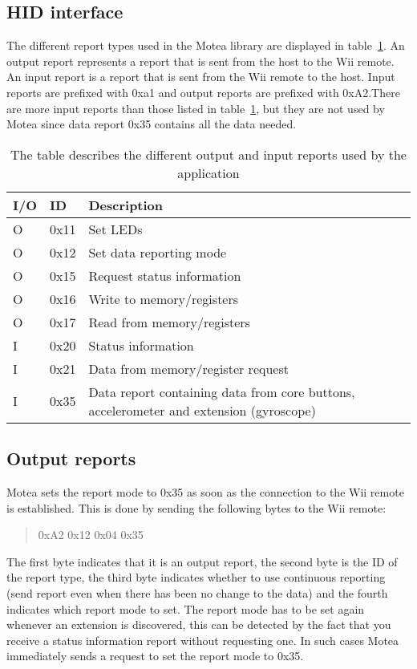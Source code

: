 \subsection{HID interface}
The different report types used in the Motea library are displayed in table~\ref{tab:hidInterface}. An output report represents a report that is sent from the host to the Wii remote. An input report is a report that is sent from the Wii remote to the host. Input reports are prefixed with 0xa1 and output reports are prefixed with 0xA2.There are more input reports than those listed in table~\ref{tab:hidInterface}, but they are not used by Motea since data report 0x35 contains all the data needed. 

\begin{table}[h!]
\centering
\begin{tabularx}{\textwidth}{|l|l|X|}
\hline
I/O & ID & Description \\ \hline
O & 0x11 & Set LEDs \\ \hline
O & 0x12 & Set data reporting mode \\ \hline
O & 0x15 & Request status information \\ \hline
O & 0x16 & Write to memory/registers \\ \hline
O & 0x17 & Read from memory/registers \\ \hline
I & 0x20 & Status information \\ \hline
I & 0x21 & Data from memory/register request \\ \hline
I & 0x35 & Data report containing data from core buttons, accelerometer and extension (gyroscope) \\ \hline
\end{tabularx}
\caption{\footnotesize The table describes the different output and input reports used by the application}
\label{tab:hidInterface}
\end{table}

\subsection{Output reports}
Motea sets the report mode to 0x35 as soon as the connection to the Wii remote is established. This is done by sending the following bytes to the Wii remote:
\begin{quote}
0xA2 0x12 0x04 0x35
\end{quote}
The first byte indicates that it is an output report, the second byte is the ID of the report type, the third byte indicates whether to use continuous reporting (send report even when there has been no change to the data) and the fourth indicates which report mode to set. The report mode has to be set again whenever an extension is discovered, this can be detected by the fact that you receive a status information report without requesting one. In such cases Motea immediately sends a request to set the report mode to 0x35.

